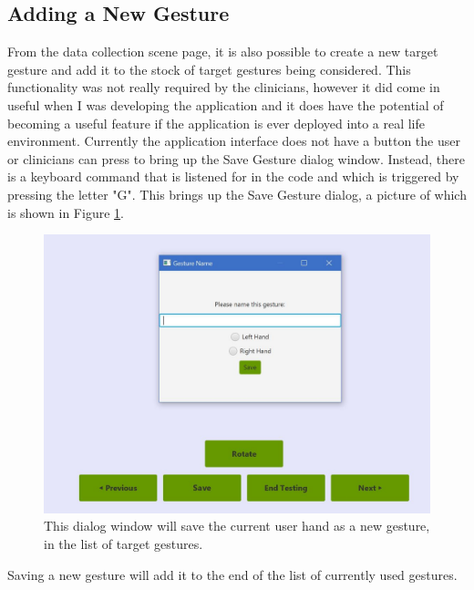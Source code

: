 \subsection{Adding a New Gesture}
From the data collection scene page, it is also possible to create a new target gesture and add it to the stock of target gestures being considered. This functionality was not really required by the clinicians, however it did come in useful when I was developing the application and it does have the potential of becoming a useful feature if the application is ever deployed into a real life environment. Currently the application interface does not have a button the user or clinicians can press to bring up the Save Gesture dialog window. Instead, there is a keyboard command that is listened for in the code and which is triggered by pressing the letter "G". This brings up the Save Gesture dialog, a picture of which is shown in Figure \ref{fig:saveGesture}. 
\begin{figure}[H]
\centering
\includegraphics[scale=0.45]{Figures/6_createNewGesture.JPG}
\caption[Saving New Gesture]{This dialog window will save the current user hand as a new gesture, in the list of target gestures.}
\label{fig:saveGesture}
\end{figure}
Saving a new gesture will add it to the end of the list of currently used gestures. 

